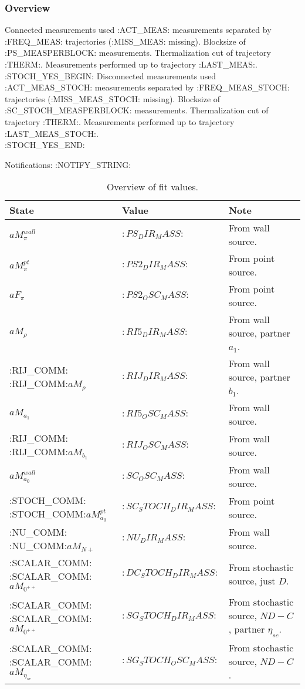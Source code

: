 

\subsubsection{Overview}

Connected measurements used :ACT_MEAS: measurements separated by :FREQ_MEAS: trajectories (:MISS_MEAS: missing). Blocksize of :PS_MEASPERBLOCK: measurements. Thermalization cut of trajectory :THERM:. Measurements performed up to trajectory :LAST_MEAS:. 
~\\

:STOCH_YES_BEGIN:
\noindent Disconnected measurements used :ACT_MEAS_STOCH: measurements separated by :FREQ_MEAS_STOCH: trajectories (:MISS_MEAS_STOCH: missing). Blocksize of :SC_STOCH_MEASPERBLOCK: measurements. Thermalization cut of trajectory :THERM:. Measurements performed up to trajectory :LAST_MEAS_STOCH:.
~\\
:STOCH_YES_END:

\noindent Notifications: :NOTIFY_STRING:

\begin{table}[ht!]
\centering
\begin{tabular}{|l|l|l|}
\hline
 State & Value & Note \\
\hline
 $aM_\pi^{wall}$ & $:PS_DIR_MASS:$ & From wall source. \\
\hline
 $aM_\pi^{pt}$ & $:PS2_DIR_MASS:$ & From point source. \\
\hline
 $aF_\pi$ & $:PS2_OSC_MASS:$ & From point source. \\
\hline
 $aM_{\rho}$ & $:RI5_DIR_MASS:$ & From wall source, partner $a_1$. \\
:RIJ_COMM:\hline
 :RIJ_COMM:$aM_{\rho}$ & $:RIJ_DIR_MASS:$ & From wall source, partner $b_1$.\\
\hline
 $aM_{a_1}$ & $:RI5_OSC_MASS:$ & From wall source. \\
:RIJ_COMM:\hline
 :RIJ_COMM:$aM_{b_1}$ & $:RIJ_OSC_MASS:$ & From wall source.\\
\hline
 $aM_{a_0}^{wall}$ & $:SC_OSC_MASS:$ & From wall source. \\
:STOCH_COMM:\hline
 :STOCH_COMM:$aM_{a_0}^{pt}$ & $:SC_STOCH_DIR_MASS:$ & From point source. \\
:NU_COMM:\hline
 :NU_COMM:$aM_{N+}$ & $:NU_DIR_MASS:$ & From wall source. \\
:SCALAR_COMM:\hline
 :SCALAR_COMM:$aM_{0^{++}}$ & $:DC_STOCH_DIR_MASS:$ & From stochastic source, just $D$. \\
:SCALAR_COMM:\hline
 :SCALAR_COMM:$aM_{0^{++}}$ & $:SG_STOCH_DIR_MASS:$ & From stochastic source, $ND-C$, partner $\eta_{sc}$. \\
:SCALAR_COMM:\hline
 :SCALAR_COMM:$aM_{\eta_{sc}}$ & $:SG_STOCH_OSC_MASS:$ & From stochastic source, $ND-C$. \\
\hline
\end{tabular}
\caption{Overview of fit values.}
\end{table}

